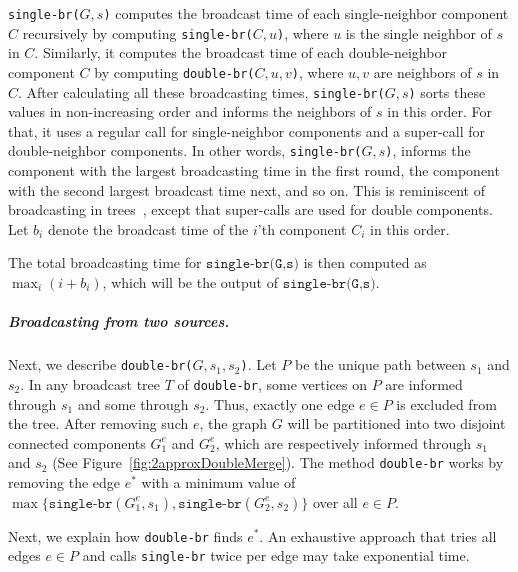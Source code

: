 \documentclass[letterpaper,11pt]{article}
\newcommand{\singlefunc}[1]{\texttt{single-br(#1)}\xspace}
\newcommand{\doublefunc}[1]{\texttt{double-br(#1)}\xspace}
\newcommand{\singlefuncc}{\texttt{single-br}\xspace}
\newcommand{\doublefuncc}{\texttt{double-br}\xspace}
\begin{document}
\singlefunc{$G,s$} computes the broadcast time of each single-neighbor component $C$ 
recursively by computing \singlefunc{$C, u$}, where $u$ is the single neighbor of $s$ in $C$. Similarly, it computes the broadcast time of each double-neighbor component $C$ by computing 
\doublefunc{$C, u, v$}, where $u, v$ are neighbors of $s$ in $C$. 
After calculating all these broadcasting times, \singlefunc{$G,s$} sorts these values in non-increasing order and informs the neighbors of $s$ in this order. For that, it uses a regular call for single-neighbor components and a super-call for double-neighbor components. 
In other words, \singlefunc{$G,s$},  informs 
the component with the largest broadcasting time in the first round, the component with the second largest broadcast time next, and so on. This is reminiscent of broadcasting in trees~\cite{fraigniaud2002polynomial}, except that super-calls are used for double components. Let $b_i$ denote the broadcast time of the $i$'th component $C_i$ in this order. 

The total broadcasting time for $\singlefunc{G,s}$ is then computed as $\max_i (i+b_i)$, which will be the output of $\singlefunc{G,s}$. 


\subparagraph*{Broadcasting from two sources.} Next, we describe \doublefunc{$G, s_1, s_2$}. 
Let $P$ be the unique path between $s_1$ and $s_2$.
In any broadcast tree $T$ of
\doublefuncc, some vertices on $P$ are informed through $s_1$ and some through $s_2$. Thus, 
exactly one edge $e \in P$ is excluded from the tree. 
After removing such $e$, the graph $G$ will be partitioned into two disjoint connected components $G_1^{e}$ and $G_2^{e}$, which are respectively informed through $s_1$ and $s_2$ (See Figure~\ref{fig:2approxDoubleMerge}). 
The method \doublefuncc works by removing the edge $e^*$
with a minimum value of 
\linebreak $\max \{ \singlefuncc (G_1^{e},s_1), \singlefuncc (G_2^{e},s_2) \}$ 
over all $e\in P$. 

Next, we explain how \doublefuncc finds $e^*$. An exhaustive approach that 
tries all edges $e\in P$ and calls \singlefuncc twice per edge may take exponential time. 
\end{document}
